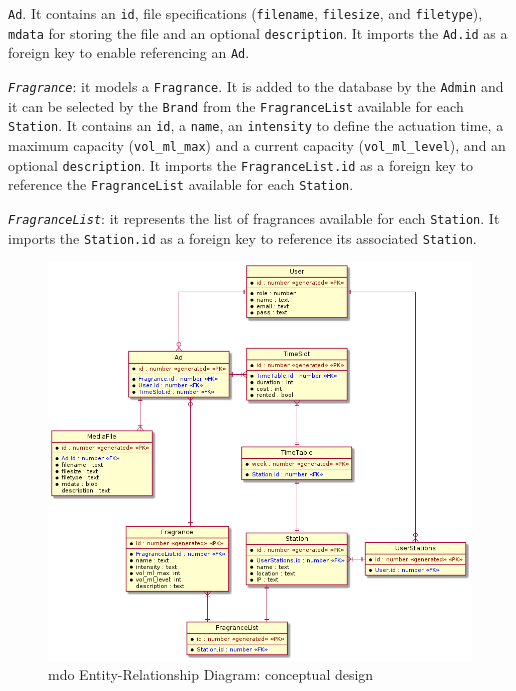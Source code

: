 \begin{item-c}
  \texttt{Ad}. It contains an \texttt{id}, file specifications (\texttt{filename}, \texttt{filesize}, and \texttt{filetype}), \texttt{mdata}
  for storing the file and an optional \texttt{description}. It
  imports the \texttt{Ad.id} as a foreign key to enable referencing an
  \texttt{Ad}.
\item
  \emph{\texttt{Fragrance}}: it models a \texttt{Fragrance}. It is added to the
  database by the \texttt{Admin} and it can be selected by the \texttt{Brand}
  from the \texttt{FragranceList} available for each \texttt{Station}.
  It contains an
  \texttt{id}, a \texttt{name}, an \texttt{intensity} to define the actuation
  time, a maximum capacity (\texttt{vol\_ml\_max}) and a current capacity
  (\texttt{vol\_ml\_level}), and an optional \texttt{description}. It
  imports the \texttt{FragranceList.id} as a foreign key to reference the
  \texttt{FragranceList} available for each \texttt{Station}.
\item
  \emph{\texttt{FragranceList}}: it represents the list of fragrances available
  for each \texttt{Station}.
  It imports the \texttt{Station.id} as a foreign key to reference its
  associated \texttt{Station}.
\end{item-c}

%
\begin{figure}[htb!]
\centering
    \includegraphics[width=1.0\columnwidth]{./img/erd.png}
  \caption{\gls{mdo} Entity-Relationship Diagram: conceptual design}%
\label{fig:erd}
\end{figure}

